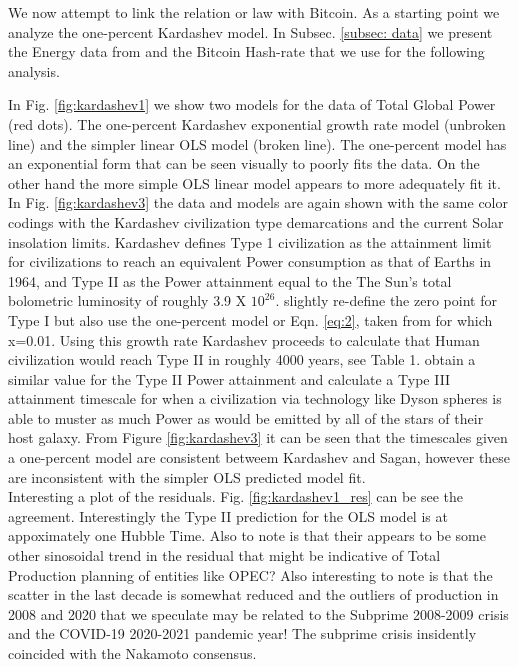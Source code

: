 \documentclass[final,5p,times,twocolumn,authoryear]{elsarticle}
\begin{document}
We now attempt to link the \cite{kar64} relation or law with Bitcoin. As a starting point we analyze the one-percent Kardashev model. In Subsec. \ref{subsec: data} we present the Energy data from \cite{owidenergy} and the Bitcoin Hash-rate that we use for the following analysis. 

In Fig. \ref{fig:kardashev1} we show two models for the data of Total Global Power (red dots). The one-percent Kardashev exponential growth rate model (unbroken line) and the simpler linear OLS model (broken line). The one-percent model has an exponential form that can be seen visually to poorly fits the data. On the other hand the more simple OLS linear model appears to more adequately fit it. In Fig. \ref{fig:kardashev3} the data and models are again shown with the same color codings with the Kardashev civilization type demarcations and the current Solar insolation limits. Kardashev defines Type 1 civilization as the attainment limit for civilizations to reach an equivalent Power consumption as that of Earths in 1964, and Type II as the Power attainment equal to the The Sun's total bolometric luminosity of roughly 3.9 X $10^{26}$. \cite{sagan73} slightly re-define the zero point for Type I but \cite{sagan73} also use the one-percent model or Eqn. \ref{eq:2}, taken from \cite{kar64} for which x=0.01. Using  this growth rate Kardashev proceeds to calculate that Human civilization would reach Type II in roughly 4000 years, see Table 1. \cite{sagan73} obtain a similar value for the Type II Power attainment and calculate a Type III attainment timescale for when a civilization via technology like Dyson spheres is able to muster as much Power as would be emitted by all of the stars of their host galaxy. From Figure \ref{fig:kardashev3} it can be seen that the timescales given a one-percent model are consistent betweem Kardashev and Sagan, however these are inconsistent with the simpler OLS predicted model fit. \\  
Interesting a plot of the residuals. Fig. \ref{fig:kardashev1_res} can be see the agreement. 
Interestingly the Type II prediction for the OLS model is at appoximately one Hubble Time. Also to note is that their appears 
to be some other sinosoidal trend in the residual that might be indicative of Total Production planning of entities like OPEC? Also interesting to note is that the scatter in the last decade is somewhat reduced and the outliers of production in 2008 and 2020 that we speculate may be related to the Subprime 2008-2009 crisis and the COVID-19 2020-2021 pandemic year! The subprime crisis insidently coincided with the Nakamoto consensus. 
\end{document}
